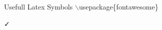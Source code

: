 \documentclass{beamer}
\begin{document}
\begin{frame}{Usefull Latex Symbols}
$\backslash$usepackage\{\alert{fontawesome}\}\par
{\faBtc}{\faIls}{\faKrw}{\faUsd}{\faEur}{\faInr}{\faRub}{\faViacoin}{\faGbp}
{\faJpy}{\faTry}{\faCopyright}{\faRegistered}{\faCreativeCommons}
{\faTrademark}{\faMars}{\faMoonO}{\faVenus}{\faMercury}{\faSunO}
{\faArrowCircleDown}{\faArrowDown}{\faLongArrowDown}{\faArrowCircleLeft}
{\faArrowLeft}{\faLongArrowLeft}{\faArrowCircleODown}{\faArrowRight}
{\faLongArrowRight}{\faArrowCircleOLeft}{\faArrows}{\faLongArrowUp}
{\faArrowCircleORight}{\faArrowsAlt}{\faRepeat}{\faArrowCircleOUp}
{\faArrowsH}{\faUndo}{\faArrowCircleRight}{\faArrowsV}{\faArrowCircleUp}
{\faArrowUp}{\faChevronCircleDown}{\faChevronCircleUp}{\faChevronRight}
{\faChevronCircleLeft}{\faChevronDown}{\faChevronUp}{\faChevronCircleRight}
{\faChevronLeft}{\faPencil}{\faPencilSquare}{\faPencilSquareO}{\faCheck}
{\faCheckSquare}{\faTimesCircle}{\faCheckCircle}{\faCheckSquareO}
{\faTimesCircleO}{\faStar}{\faStarHalf}{\faStarHalfO}{\faStarO}{\faCircle}
{\faCircleONotch}{\faDotCircleO}{\faSquareO}{\faCircleO}{\faCircleThin}
{\faSquare}{\faAmazon}{\faAnchor}{\faAndroid}{\faApple}{\faArchive}
{\faAreaChart}{\faAsterisk}{\faAt}{\faBan}{\faBarChart}{\faFighterJet}
{\faFile}{\faFileArchiveO}{\faFileAudioO}{\faFileCodeO}{\faFileExcelO}
{\faFileImageO}{\faFileO}{\faFilePdfO}{\faFilePowerpointO}{\faFilesO}
{\faFileText}{\faFileTextO}{\faFileVideoO}{\faFileWordO}{\faFirefox}
{\faFolder}{\faFolderO}{\faFolderOpen}{\faFolderOpenO}{\faFont}{\faPlane}
{\faPowerOff}{\faPrint}{\faQq}{\faQrcode}{\faQuestion}{\faQuestionCircle}
{\faRecycle}{\faReddit}{\faRefresh}{\faReply}{\faRocket}{\faRss}
{\faRssSquare}{\faSafari}{\faBell}{\faBellO}{\faBellSlash}{\faBellSlashO}
{\faBolt}{\faBook}{\faBookmark}{\faBookmarkO}{\faGg}{\faGgCircle}{\faGit}
{\faGithub}{\faGithubSquare}{\faGlass}{\faGlobe}{\faGoogle}
{\faGraduationCap}{\faHeart}{\faHeartbeat}{\faHeartO}{\faHome}
{\faInternetExplorer}{\faKey}{\faSignal}{\faSkyatlas}{\faSkype}{\faSlack}
{\faSmileO}{\faSort}{\faSortAlphaAsc}{\faSortAlphaDesc}{\faSortAmountAsc}
{\faSortAmountDesc}{\faSortNumericAsc}{\faSortNumericDesc}{\faSoundcloud}
{\faSpaceShuttle}{\faSpinner}{\faStackOverflow}{\faSteam}{\faSteamSquare}
{\faStickyNote}{\faStickyNote}{\faStop}{\faSubway}{\faChrome}{\faClockO}
{\faCloudDownload}{\faCloudUpload}{\faCode}{\faCodeFork}{\faCodepen}
{\faCoffee}{\faCog}{\faCogs}{\faComment}{\faCommentO}{\faComments}
{\faCommentsO}{\faCube}{\faDesktop}{\faDiamond}{\faDownload}{\faDropbox}
{\faEmpire}{\faLanguage}{\faLaptop}{\faLeaf}{\faLineChart}{\faLocationArrow}

\end{frame}
\end{document}
